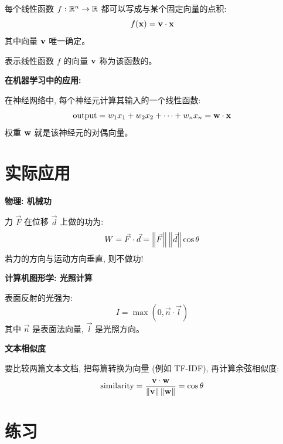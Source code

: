 \begin{theorem}[对偶性]
每个线性函数 $f: \mathbb{R}^n \to \mathbb{R}$ 都可以写成与某个固定向量的点积:
\[
f(\mathbf{x}) = \mathbf{v} \cdot \mathbf{x}
\]
其中向量 $\mathbf{v}$ 唯一确定。
\end{theorem}

\begin{definition}[对偶向量]
表示线性函数 $f$ 的向量 $\mathbf{v}$ 称为该函数的。
\end{definition}

\begin{practical}
\textbf{在机器学习中的应用:}

在神经网络中, 每个神经元计算其输入的一个线性函数:
\[
\text{output} = w_1 x_1 + w_2 x_2 + \cdots + w_n x_n = \mathbf{w} \cdot \mathbf{x}
\]
权重 $\mathbf{w}$ 就是该神经元的对偶向量。
\end{practical}

\section{实际应用}

\begin{practical}
\textbf{物理: 机械功}

力 $\vec{F}$ 在位移 $\vec{d}$ 上做的功为:
\[
W = \vec{F} \cdot \vec{d} = \left\| \vec{F} \right\| \left\| \vec{d} \right\| \cos\theta
\]
若力的方向与运动方向垂直, 则不做功!
\end{practical}

\begin{practical}
\textbf{计算机图形学: 光照计算}

表面反射的光强为:
\[
I = \max(0, \vec{n} \cdot \vec{l})
\]
其中 $\vec{n}$ 是表面法向量, $\vec{l}$ 是光照方向。
\end{practical}

\begin{practical}
\textbf{文本相似度}

要比较两篇文本文档, 把每篇转换为向量 (例如 TF-IDF), 再计算余弦相似度:
\[
\text{similarity} = \frac{\mathbf{v} \cdot \mathbf{w}}{\left\| \mathbf{v} \right\|\left\| \mathbf{w} \right\|} = \cos\theta
\]
\end{practical}

\section{练习}

